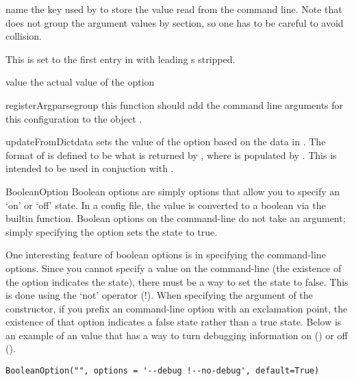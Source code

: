 \begin{memberdesc}[Option]{name}
  the key used by  to store the value read from the command line.
  Note that  does not group the argument values by section, so
  one has to be careful to avoid collision.

  This is set to the first entry in  with leading \code{-}s
  stripped.
\end{memberdesc}

\begin{memberdesc}[Option]{value}
  the actual value of the option
\end{memberdesc}

\begin{methoddesc}[Option]{registerArgparse}{group}
  this function should add the command line arguments for this configuration to
  the  object .
\end{methoddesc}

\begin{methoddesc}[Option]{updateFromDict}{data}
  sets the value of the option based on the data in . The format of
   is defined to be what is returned by
  , where  is populated by
  . This is intended to be used in conjuction with
  .
\end{methoddesc}

\begin{classdesc}{BooleanOption}{}
Boolean options are simply options that allow you to specify an `on' or 
`off' state. In a config file, the value is converted to a boolean via the
builtin  function. Boolean options on the command-line do not take
an argument; simply specifying the option sets the state to true.

One interesting feature of boolean options is in specifying the command-line
options.  Since you cannot specify a value on the command-line (the existence
of the option indicates the state), there must be a way to set the state to
false.  This is done using the `not' operator (!).  When specifying the 
 argument of the constructor, if you prefix an command-line 
option with an exclamation point, the existence of that option indicates
a false state rather than a true state.  Below is an example of an 
value that has a way to turn debugging information on () 
or off ().
\begin{verbatim}
BooleanOption("", options = '--debug !--no-debug', default=True)
\end{verbatim}
\end{classdesc}

